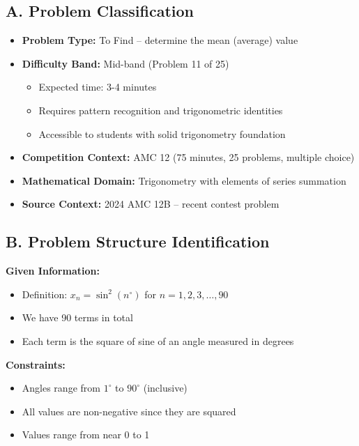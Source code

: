 \documentclass[12pt]{article}
\begin{document}
\begin{problemconfigbox}
\subsection*{A. Problem Classification}

\begin{itemize}[leftmargin=*]
    \item \textbf{Problem Type:} To Find -- determine the mean (average) value
    \item \textbf{Difficulty Band:} Mid-band (Problem 11 of 25)
    \begin{itemize}
        \item Expected time: 3-4 minutes
        \item Requires pattern recognition and trigonometric identities
        \item Accessible to students with solid trigonometry foundation
    \end{itemize}
    \item \textbf{Competition Context:} AMC 12 (75 minutes, 25 problems, multiple choice)
    \item \textbf{Mathematical Domain:} Trigonometry with elements of series summation
    \item \textbf{Source Context:} 2024 AMC 12B -- recent contest problem
\end{itemize}

\subsection*{B. Problem Structure Identification}

\textbf{Given Information:}
\begin{itemize}
    \item Definition: $x_n = \sin^2(n^{\circ})$ for $n = 1, 2, 3, \ldots, 90$
    \item We have 90 terms in total
    \item Each term is the square of sine of an angle measured in degrees
\end{itemize}

\textbf{Constraints:}
\begin{itemize}
    \item Angles range from $1^{\circ}$ to $90^{\circ}$ (inclusive)
    \item All values are non-negative since they are squared
    \item Values range from near 0 to 1
\end{itemize}


\end{problemconfigbox}
\end{document}
